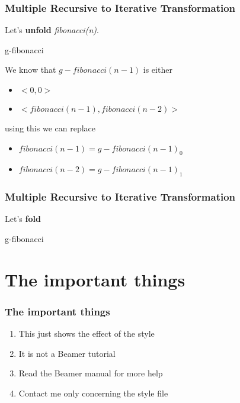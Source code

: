 \documentclass{beamer}
\begin{document}
\begin{frame}
	\frametitle{Multiple Recursive to Iterative Transformation}
	Let's \textbf{unfold} \textit{fibonacci(n)}.
	\begin{block}{g-fibonacci}
		\tiny
		\begin{algorithmic}[1]
					\State{}
				\Else
					\State{}
				\EndIf
			\EndProcedure
		\end{algorithmic}
	\end{block}
	We know that $g-fibonacci(n-1)$ is either
	\begin{itemize}
		\item $<0,0>$
		\item $<fibonacci(n-1),fibonacci(n-2)>$
	\end{itemize}
	using this we can replace
	\begin{itemize}
		\item $fibonacci(n-1) = g-fibonacci(n-1)_0$
		\item $fibonacci(n-2) = g-fibonacci(n-1)_1$
	\end{itemize}
\end{frame}
\begin{frame}
	\frametitle{Multiple Recursive to Iterative Transformation}
	Let's \textbf{fold}
	\begin{block}{g-fibonacci}
		\tiny
		\begin{algorithmic}[1]
					\State{}
				\Else
					\State{}
				\EndIf
			\EndProcedure
		\end{algorithmic}
	\end{block}
\end{frame}	
\section{The important things}

\begin{frame}
	\frametitle{The important things}

	\begin{enumerate}
	        \item This just shows the effect of the style
		\item It is not a Beamer tutorial
		\item Read the Beamer manual for more help
		\item Contact me only concerning the style file
	\end{enumerate}
\end{frame}
\end{document}
